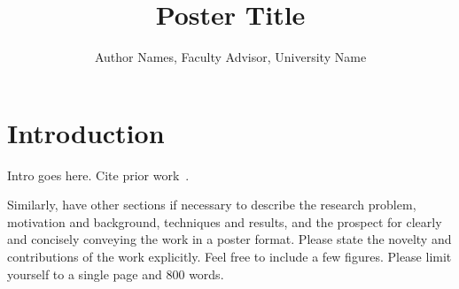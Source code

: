 \documentclass[times, 10pt,twocolumn]{article}
\begin{document}
\title{
\vspace{-0.8in}
Poster Title
\vspace{-0.2in}
}
\author{Author Names, Faculty Advisor, University Name
}

\maketitle
\thispagestyle{empty}

\section{Introduction}
\label{intro}

Intro goes here.  Cite prior work~\cite{Spiegelman2016}.

Similarly, have other sections if necessary to describe the research
problem, motivation and background, techniques and results, and the prospect
for clearly and concisely conveying the work in a poster format.  Please
state the novelty and contributions of the work explicitly.  Feel free
to include a few figures.  Please limit yourself to a single page and 800 words.

% 
\printbibliography
\end{document}
